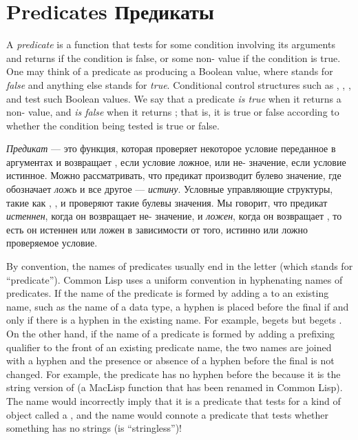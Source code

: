 
\clearpage\def\pagestatus{FINAL PROOF}

\chapter{Predicates Предикаты}
\label{PREDS}

A \emph{predicate} is a function that tests for some condition involving
its arguments and returns {\false} if the condition is false, or some
non-{\false} value if the condition is true.  One may think of a predicate as
producing a Boolean value, where {\false} stands for \emph{false} and anything
else stands for \emph{true}.  Conditional control structures such as
,
, , and  test such Boolean values.
We say that a predicate \emph{is true} when it returns a non-{\false} value,
and \emph{is false} when it returns {\false}; that is, it is true or false
according to whether the condition being tested is true or false.

\emph{Предикат} --- это функция, которая проверяет некоторое условие
переданное в аргументах и возвращает {\false}, если условие ложное, или
не-{\false} значение, если условие истинное. Можно рассматривать, что предикат
производит булево значение, где \cd{\false} обозначает \emph{ложь} и все
другое --- \emph{истину}. Условные управляющие структуры, такие как ,
,  и  проверяют такие булевы значения.
Мы говорит, что предикат \emph{истеннен}, когда он возвращает не-{\false}
значение, и \emph{ложен}, когда он возвращает {\false}, то есть он истеннен
или ложен в зависимости от того, истинно или ложно проверяемое условие.

By convention, the names of predicates usually end in the letter
 (which stands for ``predicate'').
Common Lisp uses a uniform convention in hyphenating names of predicates.
If the name of the predicate is formed by adding a  to
an existing name, such as the name of a data type,
a hyphen is placed before the final  if and only if there is
a hyphen in the existing name.  For example,  begets 
but  begets .
On the other hand, if the name of a predicate is formed by adding
a prefixing qualifier to the front of an existing predicate name,
the two names are joined with a hyphen and the presence or absence
of a hyphen before the final  is not changed.  For example,
the predicate  has no hyphen before the 
because it is the string version of  (a MacLisp function
that has been renamed \cdf{<} in Common Lisp).  The name 
would incorrectly imply that it is a predicate that tests for a kind
of object called a , and the name 
would connote a predicate that tests whether something has no strings
(is ``stringless'')!


